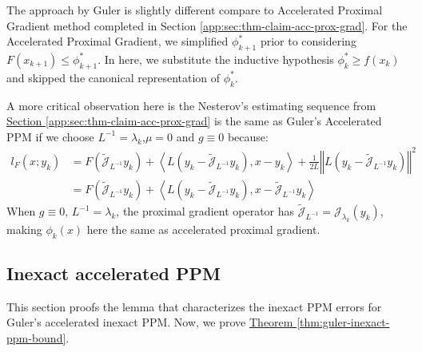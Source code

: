 \documentclass[12pt]{article}
\begin{document}
        \begin{remark}
            The approach by Guler is slightly different compare to Accelerated Proximal Gradient method completed in Section \ref*{app:sec:thm-claim-acc-prox-grad}. 
            For the Accelerated Proximal Gradient, we simplified $\phi_{k + 1}^*$ prior to considering $F(x_{k + 1}) \le \phi_{k + 1}^*$. 
            In here, we substitute the inductive hypothesis $\phi_k^* \ge f(x_k)$ and skipped the canonical representation of $\phi_k^*$. 

            A more critical observation here is the Nesterov's estimating sequence from 
            \hyperref[app:sec:thm-claim-acc-prox-grad]{Section \ref*{app:sec:thm-claim-acc-prox-grad}} is the same as Guler's Accelerated PPM if we choose $L^{-1} = \lambda_k$,$\mu = 0$ and $g \equiv 0$ because: 
            \begin{align*}
                l_F(x; y_k) 
                &= 
                F\left(\widetilde{\mathcal J}_{L^{-1}} y_k\right) + 
                \left\langle 
                    L\left(y_k - \widetilde{\mathcal J}_{L^{-1}}y_k\right), 
                    x - y_k
                \right\rangle
                + 
                \frac{1}{2L} 
                \left\Vert 
                    L \left(y_k - \widetilde{\mathcal J}_{L^{-1}}y_k\right)
                \right\Vert^2
                \\
                &= 
                F\left(\widetilde{\mathcal J}_{L^{-1}} y_k\right) + 
                \left\langle 
                    L\left(y_k - \widetilde{\mathcal J}_{L^{-1}}y_k\right), 
                    x - \widetilde{\mathcal J}_{L^{-1}}y_k
                \right\rangle
            \end{align*}
            When $g\equiv 0$, $L^{-1} = \lambda_k$, the proximal gradient operator has $\widetilde{\mathcal J}_{L^{-1}} = \mathcal J_{\lambda_k}(y_k)$, making $\phi_k(x)$ here the same as accelerated proximal gradient. 
        \end{remark}
    \subsection{Inexact accelerated PPM}\label{app:sec:inxt-acc-ppm}
        This section proofs the lemma that characterizes the inexact PPM errors for Guler's accelerated inexact PPM. 
        Now, we prove 
        \hyperref[thm:guler-inexact-ppm-bound]{Theorem \ref*{thm:guler-inexact-ppm-bound}}. 
                
\end{document}
